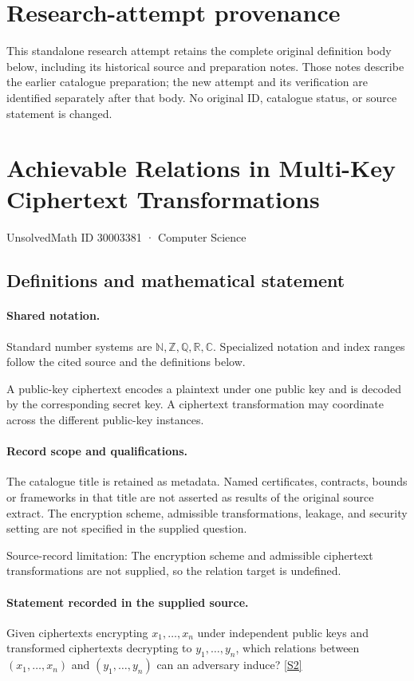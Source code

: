\documentclass[11pt]{article}
\begin{document}
\section*{Research-attempt provenance}
This standalone research attempt retains the complete original definition body below,
including its historical source and preparation notes. Those notes describe the
earlier catalogue preparation; the new attempt and its verification are identified
separately after that body. No original ID, catalogue status, or source statement is changed.

\section{Achievable Relations in Multi-Key Ciphertext Transformations}\label{30003381}
{\small UnsolvedMath ID 30003381 · Computer Science}
\subsection{Definitions and mathematical statement}

\paragraph{Shared notation.}Standard number systems are $\mathbb N,\mathbb Z,\mathbb Q,\mathbb R,\mathbb C$. Specialized notation and index ranges follow the cited source and the definitions below.


A public-key ciphertext encodes a plaintext under one public key and is decoded by the corresponding secret key. A ciphertext transformation may coordinate across the different public-key instances.
\paragraph{Record scope and qualifications.}
The catalogue title is retained as metadata. Named certificates, contracts, bounds or frameworks in that title are not asserted as results of the original source extract.
The encryption scheme, admissible transformations, leakage, and security setting are not specified in the supplied question.

Source-record limitation: The encryption scheme and admissible ciphertext transformations are not supplied, so the relation target is undefined.
\paragraph{Statement recorded in the supplied source.}
Given ciphertexts encrypting $x_1,\ldots,x_n$ under independent public keys and transformed ciphertexts decrypting to $y_1,\ldots,y_n$, which relations between $(x_1,\ldots,x_n)$ and $(y_1,\ldots,y_n)$ can an adversary induce? \href{https://doi.org/10.4171/owr/2017/5}{[S2]}
\end{document}
